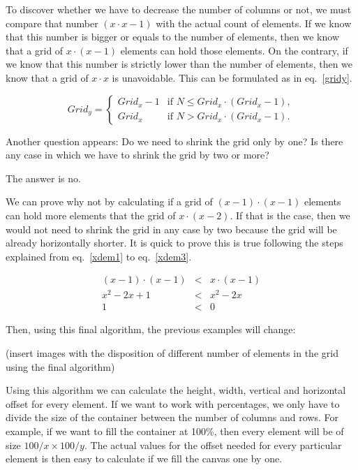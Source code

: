 To discover whether we have to decrease the number of columns or not, we must compare that number $(x \cdot x - 1)$ with the actual count of elements.
If we know that this number is bigger or equals to the number of elements, then we know that a grid of $x \cdot (x - 1)$ elements can hold those elements.
On the contrary, if we know that this number is strictly lower than the number of elements, then we know that a grid of $x \cdot x$ is unavoidable.
This can be formulated as in eq.~\eqref{gridy}.

\begin{equation}
  Grid_{y} = 
  \begin{cases}
    Grid_{x} - 1 & \text{if } N \leq Grid_{x} \cdot (Grid_{x} - 1),\\
    Grid_{x} & \text{if } N > Grid_{x} \cdot (Grid_{x} - 1).
  \end{cases} \label{gridy}
\end{equation}

Another question appears: Do we need to shrink the grid only by one?
Is there any case in which we have to shrink the grid by two or more?

The answer is no.

We can prove why not by calculating if a grid of $(x - 1) \cdot (x - 1)$ elements can hold more elements that the grid of $x \cdot (x - 2)$.
If that is the case, then we would not need to shrink the grid in any case by two because the grid will be already horizontally shorter.
It is quick to prove this is true following the steps explained from eq.~\eqref{xdem1} to eq.~\eqref{xdem3}.

\begin{eqnarray}
  (x-1) \cdot (x-1) &<& x \cdot (x-1) \label{xdem1} \\
  x^2-2x+1 &<& x^2-2x \label{xdem2} \\
  1 &<& 0 \label{xdem3}
\end{eqnarray}

Then, using this final algorithm, the previous examples will change:

(insert images with the disposition of different number of elements in the grid using the final algorithm)

Using this algorithm we can calculate the height, width, vertical and horizontal offset for every element.
If we want to work with percentages, we only have to divide the size of the container between the number of columns and rows.
For example, if we want to fill the container at 100\%, then every element will be of size $100/x \times 100/y$.
The actual values for the offset needed for every particular element is then easy to calculate if we fill the canvas one by one.

